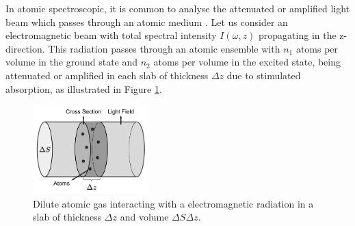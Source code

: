 In atomic spectroscopic, it is common to analyse the attenuated or amplified light beam which passes through an atomic medium \cite{reinaudi2007strong, smith2011absorption, shu2004absorption}. Let us consider an electromagnetic beam with total spectral intensity $ I(\omega, z) $ propagating in the z-direction. This radiation passes through an atomic ensemble with $ n_1 $ atoms per volume in the ground state and $ n_2 $ atoms per volume in the excited state, being attenuated or amplified in each slab of thickness $ \Delta z $ due to stimulated absorption, as illustrated in Figure \ref{fig:absorption-cross-section}.

\begin{figure}[!ht]
	\centering
	\includegraphics[width=0.40\textwidth]{USPSC-img/cross_section_scheme.png}
	\caption{Dilute atomic gas interacting with a electromagnetic radiation in a slab of thickness $ \Delta z $ and volume $ \Delta S \Delta z $.}
	\label{fig:absorption-cross-section}
\end{figure}

